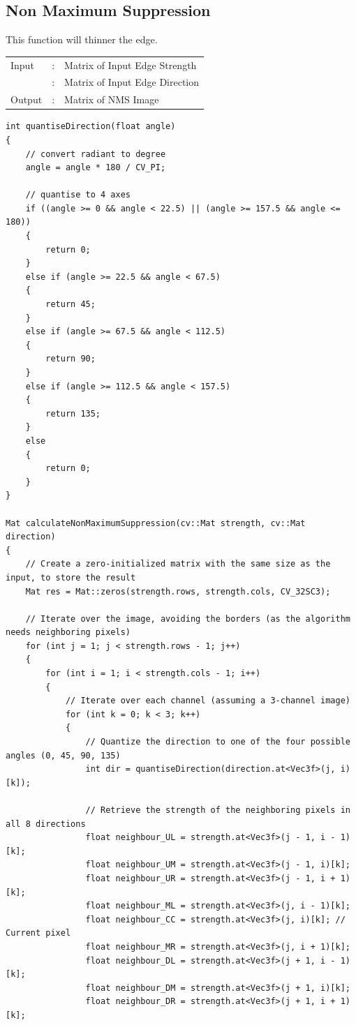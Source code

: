 \documentclass[12pt,a4paper]{report}
\begin{document}
\subsection{Non Maximum Suppression}
This function will thinner the edge.
\begin{tabular}{lll}
  Input  & : & Matrix of Input Edge Strength  \\
         & : & Matrix of Input Edge Direction  \\
  Output & : & Matrix of NMS Image \\
\end{tabular}
\begin{lstlisting}
int quantiseDirection(float angle)
{
    // convert radiant to degree
    angle = angle * 180 / CV_PI;

    // quantise to 4 axes 
    if ((angle >= 0 && angle < 22.5) || (angle >= 157.5 && angle <= 180))
    {
        return 0;
    }
    else if (angle >= 22.5 && angle < 67.5)
    {
        return 45;
    }
    else if (angle >= 67.5 && angle < 112.5)
    {
        return 90;
    }
    else if (angle >= 112.5 && angle < 157.5)
    {
        return 135;
    }
    else
    {
        return 0;
    }
}

Mat calculateNonMaximumSuppression(cv::Mat strength, cv::Mat direction)
{
    // Create a zero-initialized matrix with the same size as the input, to store the result
    Mat res = Mat::zeros(strength.rows, strength.cols, CV_32SC3);

    // Iterate over the image, avoiding the borders (as the algorithm needs neighboring pixels)
    for (int j = 1; j < strength.rows - 1; j++)
    {
        for (int i = 1; i < strength.cols - 1; i++)
        {
            // Iterate over each channel (assuming a 3-channel image)
            for (int k = 0; k < 3; k++)
            {
                // Quantize the direction to one of the four possible angles (0, 45, 90, 135)
                int dir = quantiseDirection(direction.at<Vec3f>(j, i)[k]);

                // Retrieve the strength of the neighboring pixels in all 8 directions
                float neighbour_UL = strength.at<Vec3f>(j - 1, i - 1)[k];
                float neighbour_UM = strength.at<Vec3f>(j - 1, i)[k];
                float neighbour_UR = strength.at<Vec3f>(j - 1, i + 1)[k];
                float neighbour_ML = strength.at<Vec3f>(j, i - 1)[k];
                float neighbour_CC = strength.at<Vec3f>(j, i)[k]; // Current pixel
                float neighbour_MR = strength.at<Vec3f>(j, i + 1)[k];
                float neighbour_DL = strength.at<Vec3f>(j + 1, i - 1)[k];
                float neighbour_DM = strength.at<Vec3f>(j + 1, i)[k];
                float neighbour_DR = strength.at<Vec3f>(j + 1, i + 1)[k];


\end{lstlisting}
\end{document}
